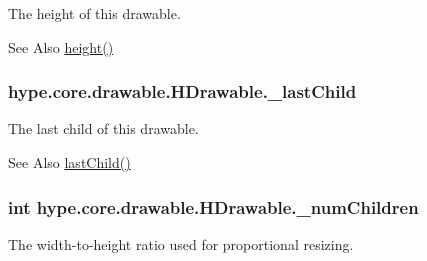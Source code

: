 The height of this drawable. 

\begin{DoxySeeAlso}{See Also}
\hyperlink{classhype_1_1core_1_1drawable_1_1_h_drawable_a60c5ca2c8e2fc75fda7221cf4f74010b}{height()} 
\end{DoxySeeAlso}
\hypertarget{classhype_1_1core_1_1drawable_1_1_h_drawable_aefc226e22c24a1a73e55d8a793e802f9}{
\subsubsection[{\-\_\-last\-Child}]{ hype.\-core.\-drawable.\-H\-Drawable.\-\_\-last\-Child\hspace{0.3cm}{\ttfamily [protected]}}}\label{classhype_1_1core_1_1drawable_1_1_h_drawable_aefc226e22c24a1a73e55d8a793e802f9}


The last child of this drawable. 

\begin{DoxySeeAlso}{See Also}
\hyperlink{classhype_1_1core_1_1drawable_1_1_h_drawable_a2fcc779fd97b24ef039c92cbc606717f}{last\-Child()} 
\end{DoxySeeAlso}
\hypertarget{classhype_1_1core_1_1drawable_1_1_h_drawable_a3d2ec798d880968b25a5c81a8dd31357}{
\subsubsection[{\-\_\-num\-Children}]{\setlength{\rightskip}{0pt plus 5cm}int hype.\-core.\-drawable.\-H\-Drawable.\-\_\-num\-Children\hspace{0.3cm}{\ttfamily [protected]}}}\label{classhype_1_1core_1_1drawable_1_1_h_drawable_a3d2ec798d880968b25a5c81a8dd31357}


The width-\/to-\/height ratio used for proportional resizing. 

